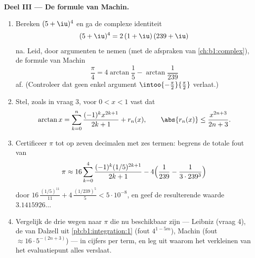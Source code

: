 \begin{problem}
\medskip
\noindent\textbf{Deel III --- De formule van Machin.}
\begin{enumerate}[resume]
  \item Bereken $(5 + \iu)^4$ en ga de complexe identiteit
        \[
        (5 + \iu)^4 = 2\,(1 + \iu)\,(239 + \iu)
        \]
        na. Leid, door argumenten te nemen (met de afspraken van
        \cref{ch:b1:complex}), de formule van Machin
        \[
        \frac\pi4 = 4\arctan\frac15 - \arctan\frac{1}{239}
        \]
        af. (Controleer dat geen enkel argument
        $\intoo{-\frac\pi2}{\frac\pi2}$ verlaat.)
  \item Stel, zoals in vraag 3, voor $0 < x < 1$ vast dat
        \[
        \arctan x = \sum_{k=0}^{n} \frac{(-1)^k
        x^{2k+1}}{2k+1} + r_n(x), \qquad \abs{r_n(x)} \leq
        \frac{x^{2n+3}}{2n+3} .
        \]
  \item Certificeer $\pi$ tot op zeven decimalen met zes termen:
        begrens de totale fout van
        \[
        \pi \approx 16\sum_{k=0}^{4}
        \frac{(-1)^k (1/5)^{2k+1}}{2k+1}
        - 4\Bigl(\frac{1}{239} - \frac{1}{3\cdot239^3}\Bigr)
        \]
        door $16\,\frac{(1/5)^{11}}{11} +
        4\,\frac{(1/239)^5}{5} < 5\cdot10^{-8}$, en geef de
        resulterende waarde $3.1415926\dots$
  \item Vergelijk de drie wegen naar $\pi$ die nu beschikbaar
        zijn --- Leibniz (vraag 4), de  van Dalzell uit
        \cref{pb:b1:integration:1} (fout $4^{1-5m}$), Machin
        (fout $\approx 16\cdot 5^{-(2n+3)}$) --- in cijfers per
        term, en leg uit waarom het verkleinen van het
        evaluatiepunt alles verslaat.
\end{enumerate}


\end{problem}
